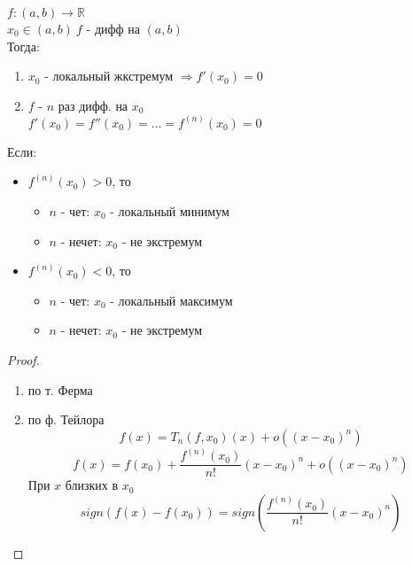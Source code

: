 \documentclass[12pt]{article}
\begin{document}
\begin{theorem}
  $f: (a, b) \rightarrow \mathbb{R}$ \\
  $x_0 \in (a, b)\ f$ - дифф на $(a, b)$ \\
  Тогда:
  \begin{enumerate}
  \item $x_0$ - локальный жкстремум $\Rightarrow f'(x_0) = 0$
  \item $f$ - $n$ раз дифф. на $x_0$ \\
    $f'(x_0) = f''(x_0) = \dots = f^{(n)}(x_0) = 0$
  \end{enumerate}
  Если:
  \begin{itemize}
  \item $f^{(n)}(x_0) > 0$, то
    \begin{itemize}
    \item $n$ - чет: $x_0$ - локальный минимум
    \item $n$ - нечет: $x_0$ - не экстремум
    \end{itemize}
  \item $f^{(n)}(x_0) < 0$, то
    \begin{itemize}
    \item $n$ - чет: $x_0$ - локальный максимум
    \item $n$ - нечет: $x_0$ - не экстремум
    \end{itemize}
  \end{itemize}
\end{theorem}
\begin{proof}
  \hfill \break
  \begin{enumerate}
  \item по т. Ферма
  \item по ф. Тейлора \\
    $$f(x) = T_n(f, x_0)(x) + o((x - x_0)^n)$$
    $$f(x) = f(x_0) + \frac{f^{(n)}(x_0)}{n!}(x-x_0)^n + o((x - x_0)^n)$$
    При $x$ близких в $x_0$
    $$sign(f(x) - f(x_0)) = sign(\frac{f^{(n)}(x_0)}{n!}(x-x_0)^n)$$
  \end{enumerate}
\end{proof}
\end{document}
